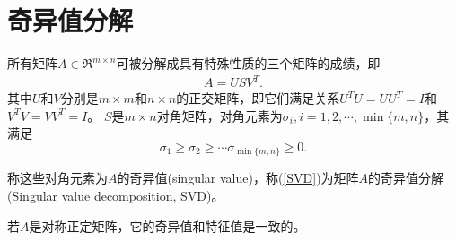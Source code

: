 \chapter{奇异值分解}
所有矩阵$A\in \Re^{m \times n}$可被分解成具有特殊性质的三个矩阵的成绩，即
\begin{eqnarray}
  A = USV^{T}. \label{SVD}
\end{eqnarray}
其中$U$和$V$分别是$m\times m$和$n\times n$的正交矩阵，即它们满足关系$U^{T}U = UU^{T} = I$和$V^{T}V = VV^{T} = I$。
$S$是$m \times n$对角矩阵，对角元素为$\sigma_{i},i = 1,2,\cdots,\min\{m,n\}$，其满足
\[
\sigma_{1} \geq \sigma_{2} \geq \cdots \sigma_{\min\{m,n\}} \geq 0 .
\]

称这些对角元素为$A$的奇异值(singular value)，称(\ref{SVD})为矩阵$A$的奇异值分解(Singular value decomposition, SVD)。

若$A$是对称正定矩阵，它的奇异值和特征值是一致的。